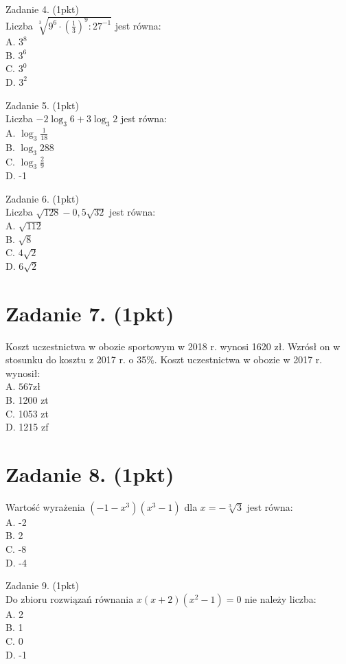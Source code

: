 \documentclass[10pt]{article}
\begin{document}
Zadanie 4. (1pkt)\\
Liczba \(\sqrt[3]{9^{6} \cdot\left(\frac{1}{3}\right)^{9}: 27^{-1}}\) jest równa:\\
A. \(3^{8}\)\\
B. \(3^{6}\)\\
C. \(3^{0}\)\\
D. \(3^{2}\)

Zadanie 5. (1pkt)\\
Liczba \(-2 \log _{3} 6+3 \log _{3} 2\) jest równa:\\
A. \(\log _{3} \frac{1}{18}\)\\
B. \(\log _{3} 288\)\\
C. \(\log _{3} \frac{2}{9}\)\\
D. -1

Zadanie 6. (1pkt)\\
Liczba \(\sqrt{128}-0,5 \sqrt{32}\) jest równa:\\
A. \(\sqrt{112}\)\\
B. \(\sqrt{8}\)\\
C. \(4 \sqrt{2}\)\\
D. \(6 \sqrt{2}\)

\section*{Zadanie 7. (1pkt)}
Koszt uczestnictwa w obozie sportowym w 2018 r. wynosi 1620 zł. Wzrósł on w stosunku do kosztu z 2017 r. o 35\%. Koszt uczestnictwa w obozie w 2017 r. wynosił:\\
A. \(567 \mathrm{zł}\)\\
B. 1200 zt\\
C. 1053 zt\\
D. 1215 zf

\section*{Zadanie 8. (1pkt)}
Wartość wyrażenia \(\left(-1-x^{3}\right)\left(x^{3}-1\right)\) dla \(x=-\sqrt[3]{3}\) jest równa:\\
A. -2\\
B. 2\\
C. -8\\
D. -4

Zadanie 9. (1pkt)\\
Do zbioru rozwiązań równania \(x(x+2)\left(x^{2}-1\right)=0\) nie należy liczba:\\
A. 2\\
B. 1\\
C. 0\\
D. -1
\end{document}
